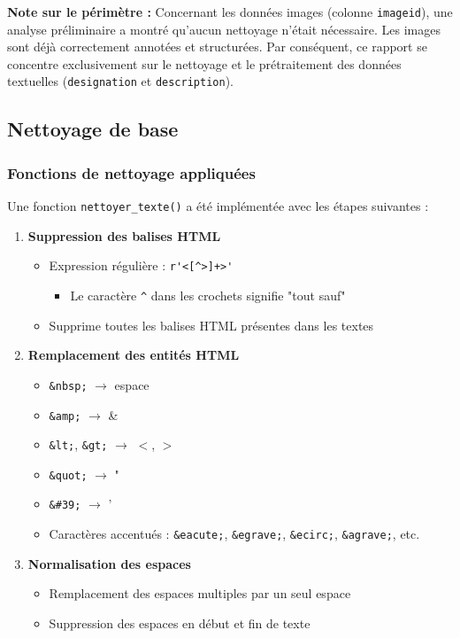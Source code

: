 \documentclass[12pt,a4paper]{article}
\begin{document}
\textbf{Note sur le périmètre :} Concernant les données images (colonne \texttt{imageid}), une analyse préliminaire a montré qu'aucun nettoyage n'était nécessaire. Les images sont déjà correctement annotées et structurées. Par conséquent, ce rapport se concentre exclusivement sur le nettoyage et le prétraitement des données textuelles (\texttt{designation} et \texttt{description}).

\subsection{Nettoyage de base}

\subsubsection{Fonctions de nettoyage appliquées}

Une fonction \texttt{nettoyer\_texte()} a été implémentée avec les étapes suivantes :

\begin{enumerate}
    \item \textbf{Suppression des balises HTML}
    \begin{itemize}
        \item Expression régulière : \verb|r'<[^>]+>'|
        \begin{itemize}
            \item Le caractère \texttt{\textasciicircum} dans les crochets signifie "tout sauf"
        \end{itemize}
        \item Supprime toutes les balises HTML présentes dans les textes
    \end{itemize}
    
    \item \textbf{Remplacement des entités HTML}
    \begin{itemize}
        \item \texttt{\&nbsp;} $\rightarrow$ espace
        \item \texttt{\&amp;} $\rightarrow$ \&
        \item \texttt{\&lt;}, \texttt{\&gt;} $\rightarrow$ $<$, $>$
        \item \texttt{\&quot;} $\rightarrow$ "
        \item \texttt{\&\#39;} $\rightarrow$ '
        \item Caractères accentués : \texttt{\&eacute;}, \texttt{\&egrave;}, \texttt{\&ecirc;}, \texttt{\&agrave;}, etc.
    \end{itemize}
    
    \item \textbf{Normalisation des espaces}
    \begin{itemize}
        \item Remplacement des espaces multiples par un seul espace
        \item Suppression des espaces en début et fin de texte
    \end{itemize}
\end{enumerate}
\end{document}
